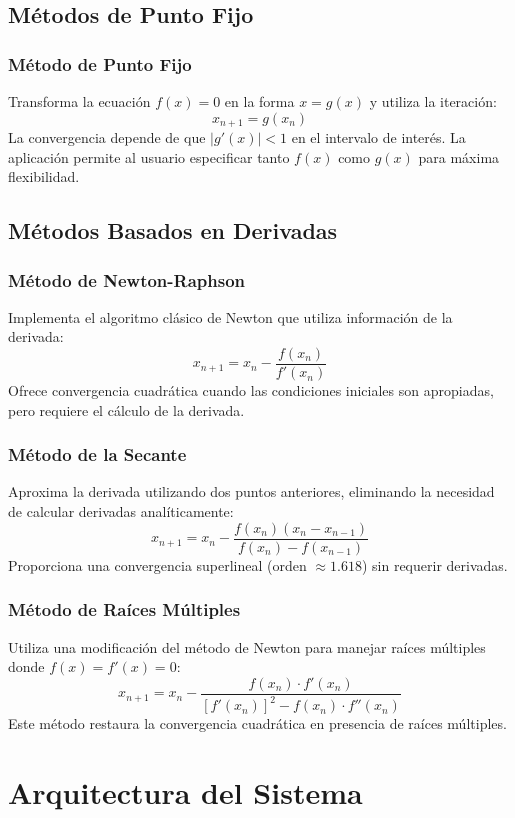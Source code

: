 \subsection{Métodos de Punto Fijo}

\subsubsection{Método de Punto Fijo}
Transforma la ecuación $f(x) = 0$ en la forma $x = g(x)$ y utiliza la iteración:
\[
x_{n+1} = g(x_n)
\]
La convergencia depende de que $|g'(x)| < 1$ en el intervalo de interés. La aplicación permite al usuario especificar tanto $f(x)$ como $g(x)$ para máxima flexibilidad.

\subsection{Métodos Basados en Derivadas}

\subsubsection{Método de Newton-Raphson}
Implementa el algoritmo clásico de Newton que utiliza información de la derivada:
\[
x_{n+1} = x_n - \frac{f(x_n)}{f'(x_n)}
\]
Ofrece convergencia cuadrática cuando las condiciones iniciales son apropiadas, pero requiere el cálculo de la derivada.

\subsubsection{Método de la Secante}
Aproxima la derivada utilizando dos puntos anteriores, eliminando la necesidad de calcular derivadas analíticamente:
\[
x_{n+1} = x_n - \frac{f(x_n)(x_n - x_{n-1})}{f(x_n) - f(x_{n-1})}
\]
Proporciona una convergencia superlineal (orden $\approx 1.618$) sin requerir derivadas.

\subsubsection{Método de Raíces Múltiples}
Utiliza una modificación del método de Newton para manejar raíces múltiples donde $f(x) = f'(x) = 0$:
\[
x_{n+1} = x_n - \frac{f(x_n) \cdot f'(x_n)}{[f'(x_n)]^2 - f(x_n) \cdot f''(x_n)}
\]
Este método restaura la convergencia cuadrática en presencia de raíces múltiples.

\section{Arquitectura del Sistema}

